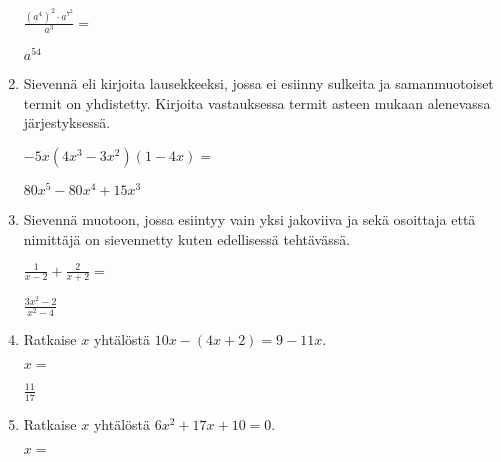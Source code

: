 \documentclass[finnish, a4paper, 12pt]{article}
\begin{document}
\begin{enumerate}[leftmargin=*]
		\(
		\displaystyle
		\frac{\left(a^4\right)^2 \cdot a^{7^2}}{a^3} =
		\phantom{mmmmmmmmmmmmmmm}
		\) %
		\begin{version:withAnswers}
		\(  a^{54} \)
		\end{version:withAnswers}
		
		\vspace{8pt}
		
		\item %
		Sievennä eli kirjoita lausekkeeksi, jossa ei esiinny sulkeita ja 
		samanmuotoiset termit on yhdistetty. 
		Kirjoita vastauksessa termit asteen mukaan alenevassa järjestyksessä. 
		
		\(
		\displaystyle
		-5x(4x^3 - 3x^2)(1 - 4x) = 
		\) %
		\begin{version:withAnswers}
		\( 80x^5 -80x^4 +15x^3 \)
		\end{version:withAnswers}
		
		\vspace{8pt}
		
		\item %
		Sievennä %
		muotoon, jossa esiintyy vain yksi jakoviiva ja sekä osoittaja
		että nimittäjä on sievennetty kuten edellisessä tehtävässä.
		
		\(
		\displaystyle
		\frac{1}{x-2}+ \frac{ 2}{x + 2} =
		\) %
		\begin{version:withAnswers}
		\( \frac{3x^2 - 2}{x^2  - 4} \)
		\end{version:withAnswers}
		
		\vspace{8pt}
		
		\item %
		Ratkaise \(x\) yhtälöstä \(10x - (4x+2) = 9 - 11x\).
		
		\(
		x = 
		\)	%
		\begin{version:withAnswers}
		 \( \frac{11}{17} \)
		\end{version:withAnswers}
		\vspace{8pt}
		
		\item %
		Ratkaise \(x\) yhtälöstä \(6 x^2  + 17 x + 10= 0\).
		
		\(
		x = 		
		\)	%
		

\end{enumerate}
\end{document}
